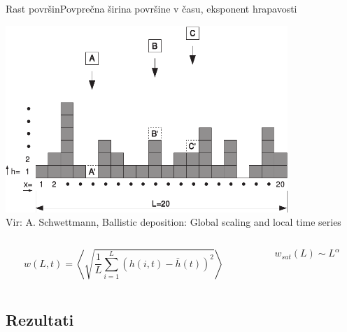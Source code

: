 \documentclass{beamer}
\begin{document}
\begin{frame}{Rast površin}{Povprečna širina površine v času, eksponent hrapavosti}
\begin{center}
  \footnotesize
  \includegraphics[width=0.8\textwidth]{slike/bdep2}
  \\ \tiny{Vir: A. Schwettmann, Ballistic deposition: Global scaling and local time series}
  \newline

\begin{columns}
  \begin{column}{0.6\textwidth}
    \begin{equation} w(L,t) = \left\langle \sqrt{\frac{1}{L} \sum_{i=1}^L (h(i,t)-\bar{h}(t))^2} \right\rangle \end{equation}
  \end{column}
  \begin{column}{0.4\textwidth}
    \begin{equation} w_{sat}(L) \sim L^\alpha \end{equation}
  \end{column}
\end{columns}
\end{center}
\end{frame}


\subsection{Rezultati}
\end{document}

